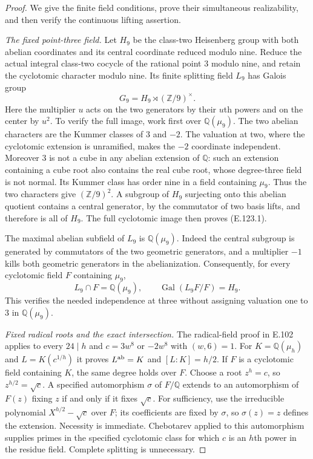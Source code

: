 \begin{proof}
We give the finite field conditions, prove their simultaneous
realizability, and then verify the continuous lifting assertion.

\emph{The fixed point-three field.}
Let $H_9$ be the class-two Heisenberg group with both abelian
coordinates and its central coordinate reduced modulo nine.
Reduce the actual integral class-two cocycle of the rational point
$3$ modulo nine, and retain the cyclotomic character modulo nine.
Its finite splitting field $L_9$ has Galois group
\[
 G_9=H_9\rtimes(\mathbb Z/9)^\times.
 \tag{E.123.1}
\]
Here the multiplier $u$ acts on the two generators by their
$u$th powers and on the center by $u^2$. To verify the full image,
work first over $\mathbb Q(\mu_9)$. The two abelian characters
are the Kummer classes of $3$ and $-2$. The valuation at two,
where the cyclotomic extension is unramified, makes the $-2$
coordinate independent. Moreover $3$ is not a cube in any abelian
extension of $\mathbb Q$: such an extension containing a cube root
also contains the real cube root, whose degree-three field is not
normal. Its Kummer class has order nine in a field containing
$\mu_9$. Thus the two characters give $(\mathbb Z/9)^2$.
A subgroup of $H_9$ surjecting onto this abelian quotient contains
a central generator, by the commutator of two basis lifts, and
therefore is all of $H_9$. The full cyclotomic image then proves
(E.123.1).

The maximal abelian subfield of $L_9$ is $\mathbb Q(\mu_9)$.
Indeed the central subgroup is generated by commutators of the
two geometric generators, and a multiplier $-1$ kills both
geometric generators in the abelianization. Consequently, for
every cyclotomic field $F$ containing $\mu_9$,
\[
 L_9\cap F=\mathbb Q(\mu_9),\qquad
 \operatorname{Gal}(L_9F/F)=H_9.
 \tag{E.123.2}
\]
This verifies the needed independence at three without assigning
valuation one to $3$ in $\mathbb Q(\mu_9)$.

\emph{Fixed radical roots and the exact intersection.}
The radical-field proof in E.102 applies to every $24\mid h$
and $c=3w^8$ or $-2w^8$ with $(w,6)=1$. For
$K=\mathbb Q(\mu_h)$ and $L=K(c^{1/h})$ it proves
$L^{\rm ab}=K$ and $[L:K]=h/2$. If $F$ is a cyclotomic field
containing $K$, the same degree holds over $F$. Choose a root
$z^h=c$, so $z^{h/2}=\sqrt c$. A specified automorphism
$\sigma$ of $F/\mathbb Q$ extends to an automorphism of $F(z)$
fixing $z$ if and only if it fixes $\sqrt c$.
For sufficiency, use the irreducible polynomial
$X^{h/2}-\sqrt c$ over $F$; its coefficients are fixed by
$\sigma$, so $\sigma(z)=z$ defines the extension. Necessity is
immediate. Chebotarev applied to this automorphism supplies primes
in the specified cyclotomic class for which $c$ is an $h$th
power in the residue field. Complete splitting is unnecessary.


\end{proof}
